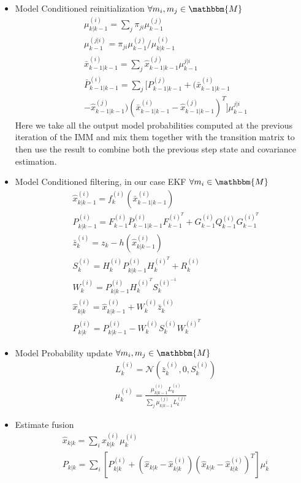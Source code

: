 \documentclass[twocolumn]{article}
\begin{document}
 \begin{itemize}
     \item Model Conditioned reinitialization $\forall m_{i},m_{j}\in \mathbbm{M}$
     \begin{align*}
                &\mu^{(i)}_{k|k-1}=\sum_{j}\pi_{ji}\mu^{(j)}_{k-1}\\
                &\mu^{(j|i)}_{k-1}=\pi_{ji}\mu^{(j)}_{k-1}/\mu^{(i)}_{k|k-1}\\
                &\bar{x}^{(i)}_{k-1|k-1}=\sum_{j}\hat{x}^{(j)}_{k-1|k-1}\mu^{j|i}_{k-1}\\
                &\bar{P}^{(i)}_{k-1|k-1}=\sum_{j}[P^{(j)}_{k-1|k-1}+(\bar{x}^{(i)}_{k-1|k-1}\\
                &-\hat{x}^{(j)}_{k-1|k-1})(\bar{x}^{(i)}_{k-1|k-1}-\hat{x}^{(j)}_{k-1|k-1})^{T}]\mu_{k-1}^{j|i}
    \end{align*}
        Here we take all the output model probabilities computed at the previous iteration of the IMM and mix them together with the 
        transition matrix to then use the result to combine both the previous step state and covariance estimation.
     \item Model Conditioned filtering, in our case EKF $\forall m_{i}\in \mathbbm{M}$
        \begin{align*}
            &\hat{x}^{(i)}_{k|k-1}=f^{(i)}_{k}(\bar{x}^{(i)}_{k-1|k-1})\\
            &P^{(i)}_{k|k-1}=F^{(i)}_{k-1}\bar{P}^{(i)}_{k-1|k-1}F^{(i)^{T}}_{k-1}+G^{(i)}_{k-1}Q_{k-1}^{(i)}G^{(i)^{T}}_{k-1}\\
            &\bar{z}^{(i)}_{k}=z_{k}-h(\hat{x}^{(i)}_{k|k-1})\\
            &S^{(i)}_{k}=H^{(i)}_{k}P^{(i)}_{k|k-1}H^{(i)^{T}}_{k}+R^{(i)}_{k}\\
            &W^{(i)}_{k}=P^{(i)}_{k|k-1}H^{(i)^{T}}_{k}S^{(i)^{-1}}_{k}\\
            &\hat{x}^{(i)}_{k|k}=\hat{x}^{(i)}_{k|k-1}+W^{(i)}_{k}\bar{z}^{(i)}_{k}\\
            &P^{(i)}_{k|k}=P^{(i)}_{k|k-1}-W^{(i)}_{k}S^{(i)}_{k}W^{(i)^{T}}_{k}
        \end{align*}
     \item Model Probability update $\forall m_{i},m_{j}\in \mathbbm{M}$
        \begin{align*}
            &L^{(i)}_{k}=\mathcal{N}(\bar{z}^{(i)}_{k},0,S^{(i)}_{k})\\
            &\mu^{(i)}_{k}=\frac{\mu^{(i)}_{k|k-1}L^{(i)}_{k}}{\sum_{j}\mu^{(j)}_{k|k-1}L^{(j)}_{k}}
        \end{align*}
     \item Estimate fusion
        \begin{align*}
         &\hat{x}_{k|k}=\sum_{i}x^{(i)}_{k|k}\mu^{(i)}_{k}\\
         &P_{k|k}=\sum_{i}[P^{(i)}_{k|k}+(\hat{x}_{k|k}-\hat{x}^{(i)}_{k|k})(\hat{x}_{k|k}-\hat{x}^{(i)}_{k|k})^{T}]\mu_{k}^{i}
     \end{align*}
 \end{itemize}
\end{document}
